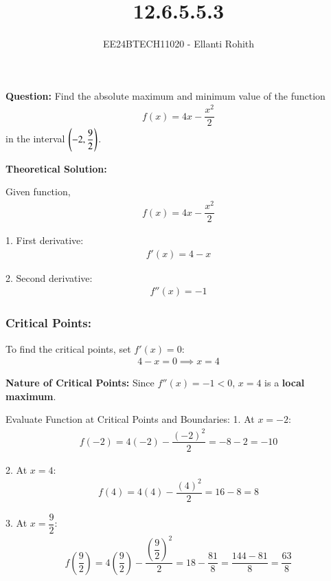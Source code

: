 \documentclass[journal]{IEEEtran}
\numberwithin{equation}{enumi}
\numberwithin{figure}{enumi}
\renewcommand{\thetable}{\theenumi}
\begin{document}

\vspace{3cm}

\title{12.6.5.5.3}
\author{EE24BTECH11020 - Ellanti Rohith}
\maketitle

\renewcommand{\thefigure}{\theenumi}
\renewcommand{\thetable}{\theenumi}


\textbf{Question:}
Find the absolute maximum and minimum value of the function 
\begin{align}
f(x) = 4x - \dfrac{x^2}{2}
\end{align}
in the interval $ \left(-2, \dfrac{9}{2}\right) $.



\textbf{Theoretical Solution:}

Given function,
\begin{align}
f(x) = 4x - \dfrac{x^2}{2}
\end{align}

1. First derivative:
\begin{align}
f'(x) = 4 - x
\end{align}

2. Second derivative:
\begin{align}
f''(x) = -1
\end{align}

\subsubsection*{Critical Points:}
To find the critical points, set $ f'(x) = 0 $:
\begin{align}
4 - x = 0 \implies x = 4
\end{align}

\textbf{Nature of Critical Points:}
Since $ f''(x) = -1 < 0 $, $ x = 4 $ is a \textbf{local maximum}.

Evaluate Function at Critical Points and Boundaries:
1. At $ x = -2 $:
\begin{align}
f(-2) = 4(-2) - \dfrac{(-2)^2}{2} = -8 - 2 = -10
\end{align}

2. At $ x = 4 $:
\begin{align}
f(4) = 4(4) - \dfrac{(4)^2}{2} = 16 - 8 = 8
\end{align}

3. At $ x = \dfrac{9}{2} $:
\begin{align}
f\left(\dfrac{9}{2}\right) = 4\left(\dfrac{9}{2}\right) - \dfrac{\left(\dfrac{9}{2}\right)^2}{2} = 18 - \dfrac{81}{8} = \dfrac{144 - 81}{8} = \dfrac{63}{8}
\end{align}
\end{document}
